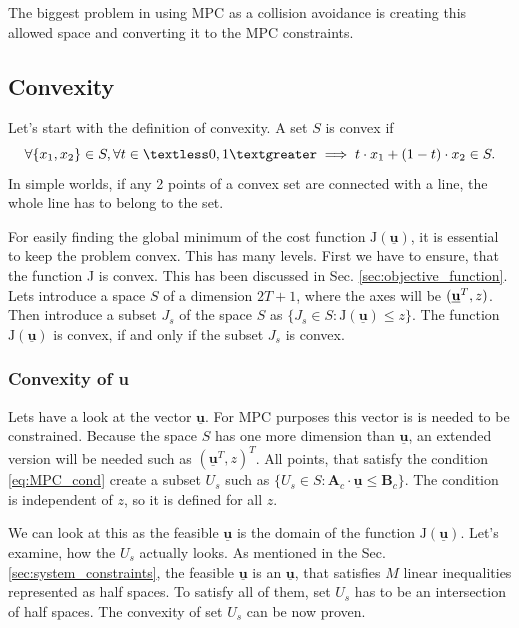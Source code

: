 \documentclass[a4paper,11pt,titlepage]{article}
\newcommand{\uvec}{\textbf{\underline{u}}}
\begin{document}
The biggest problem in using MPC as a collision avoidance is creating this allowed space and converting it to the MPC constraints. 

\subsection{Convexity}
\label{sec:convexity}
Let's start with the definition of convexity. A set $S$ is convex if
\begin{equation}
\label{eq:convexity_definition}
\forall\{x_1, x_2\} \in S, \forall t \in  \textless 0, 1 \textgreater \implies t \cdot x_1 + (1-t) \cdot x_2 \in S.
\end{equation}
In simple worlds, if any 2 points of a convex set are connected with a line, the whole line has to belong to the set.

For easily finding the global minimum of the cost function $\mathrm{J}(\underline{\textbf{u}})$, it is essential to keep the problem convex. This has many levels. First we have to ensure, that the function J is convex. This has been discussed in Sec. \ref{sec:objective_function}. Lets introduce a space $S$ of a dimension $2T+1$, where the axes will be $(\uvec^T, z)$. Then introduce a subset $J_s$ of the space $S$ as $\{J_s \in S : \mathrm{J}(\underline{\textbf{u}}) \leq z\}$. The function $\mathrm{J}(\underline{\textbf{u}})$ is convex, if and only if the subset $J_s$ is convex. 
\subsubsection{Convexity of u}
Lets have a look at the vector $\underline{\textbf{u}}$. For MPC purposes this vector is is needed to be constrained. Because the space $S$ has one more dimension than $\underline{\textbf{u}}$, an extended version will be needed such as $(\underline{\textbf{u}}^T, z)^T$.
All points, that satisfy the condition \ref{eq:MPC_cond} create a subset $U_s$ such as $\{U_s \in S : \textbf{A}_c \cdot \underline{\textbf{u}} \leq \textbf{B}_c\}$. The condition is independent of $z$, so it is defined for all $z$. 

We can look at this as the feasible $\underline{\textbf{u}}$ is the domain of the function $\mathrm{J}(\underline{\textbf{u}})$. Let's examine, how the $U_s$ actually looks. As mentioned in the Sec. \ref{sec:system_constraints}, the feasible $\underline{\textbf{u}}$ is an $\underline{\textbf{u}}$, that satisfies $M$ linear inequalities represented as half spaces. To satisfy all of them, set $U_s$ has to be an intersection of half spaces. The convexity of set $U_s$ can be now proven. 
\end{document}
